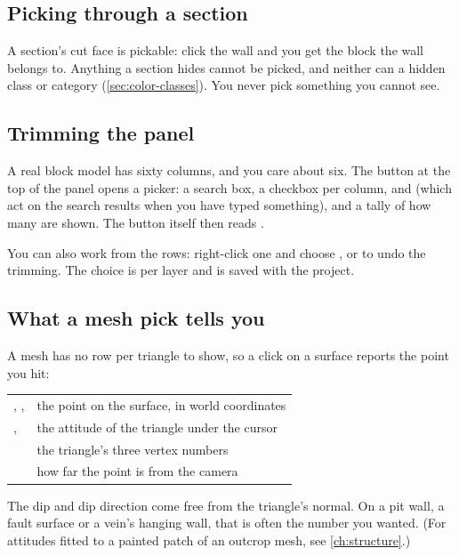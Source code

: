 \subsection{Picking through a section}
A section's cut face is pickable: click the wall and you get the block the wall belongs to. Anything a section hides cannot be picked, and neither can a hidden class or category (\cref{sec:color-classes}). You never pick something you cannot see.

\subsection{Trimming the panel}
A real block model has sixty columns, and you care about six. The  button at the top of the panel opens a picker: a search box, a checkbox per column,  and  (which act on the search results when you have typed something), and a tally of how many are shown. The button itself then reads .

You can also work from the rows: right-click one and choose , or  to undo the trimming. The choice is per layer and is saved with the project.

\subsection{What a mesh pick tells you}
A mesh has no row per triangle to show, so a click on a surface reports the point you hit:

\begin{center}
\begin{tabularx}{\linewidth}{@{}lL@{}}\toprule
{}, ,  & the point on the surface, in world coordinates \\
,  & the attitude of the triangle under the cursor \\
 & the triangle's three vertex numbers \\
 & how far the point is from the camera \\ \bottomrule
\end{tabularx}
\end{center}

The dip and dip direction come free from the triangle's normal. On a pit wall, a fault surface or a vein's hanging wall, that is often the number you wanted. (For attitudes fitted to a painted patch of an outcrop mesh, see \cref{ch:structure}.)

